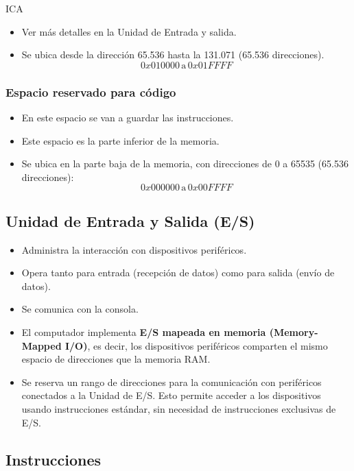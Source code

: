 ICA\documentclass{article}
\begin{document}
\begin{itemize}
  \item Ver más detalles en la Unidad de Entrada y salida.
  \item Se ubica desde la dirección 65.536 hasta la 131.071 (65.536 direcciones).
        \[
          0x010000 \, \text{a} \, 0x01FFFF
        \]
\end{itemize}

\subsubsection{Espacio reservado para código}

\begin{itemize}
  \item En este espacio se van a guardar las instrucciones.
  \item Este espacio es la parte inferior de la memoria.
  \item Se ubica en la parte baja de la memoria, con direcciones de 0 a 65535 (65.536 direcciones):
        \[
          0x000000 \, \text{a} \, 0x00FFFF
        \]
\end{itemize}


\subsection{Unidad de Entrada y Salida (E/S)}

\begin{itemize}
  \item Administra la interacción con dispositivos periféricos.
  \item Opera tanto para entrada (recepción de datos) como para salida (envío de datos).
  \item Se comunica con la consola.
  \item El computador implementa \textbf{E/S mapeada en memoria (Memory-Mapped I/O)}, es decir, los dispositivos periféricos comparten el mismo espacio de direcciones que la memoria RAM.
  \item Se reserva un rango de direcciones para la comunicación con periféricos conectados a la Unidad de E/S. Esto permite acceder a los dispositivos usando instrucciones estándar, sin necesidad de instrucciones exclusivas de E/S.
\end{itemize}


\subsection{Instrucciones}
\end{document}
